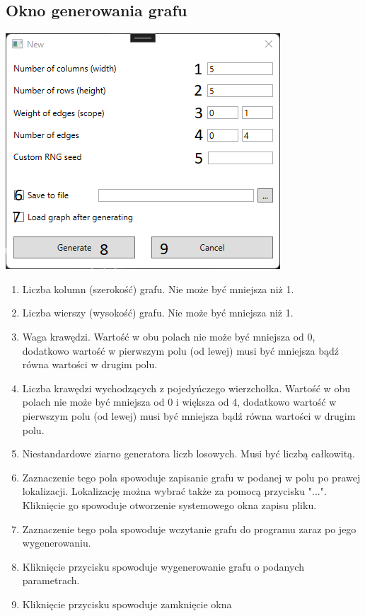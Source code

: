 \documentclass[11pt,a4paper]{report}
\begin{document}
    \subsection{Okno generowania grafu}

    \includegraphics[width=\textwidth]{view2.png}

    \begin{enumerate}
        \item Liczba kolumn (szerokość) grafu. Nie może być mniejsza niż 1.
        \item Liczba wierszy (wysokość) grafu. Nie może być mniejsza niż 1.
        \item Waga krawędzi. Wartość w obu polach nie może być mniejsza od 0, dodatkowo wartość w pierwszym polu (od lewej) musi być mniejsza bądź równa wartości w drugim polu.
        \item Liczba krawędzi wychodzących z pojedyńczego wierzchołka. Wartość w obu polach nie może być mniejsza od 0 i większa od 4, dodatkowo wartość w pierwszym polu (od lewej) musi być mniejsza bądź równa wartości w drugim polu.
        \item Niestandardowe ziarno generatora liczb losowych. Musi być liczbą całkowitą.
        \item Zaznaczenie tego pola spowoduje zapisanie grafu w podanej w polu po prawej lokalizacji. Lokalizację można wybrać także za pomocą przycisku "...". Kliknięcie go spowoduje otworzenie systemowego okna zapisu pliku.
        \item Zaznaczenie tego pola spowoduje wczytanie grafu do programu zaraz po jego wygenerowaniu.
        \item Kliknięcie przycisku spowoduje wygenerowanie grafu o podanych parametrach.
        \item Kliknięcie przycisku spowoduje zamknięcie okna
    \end{enumerate}
\end{document}
